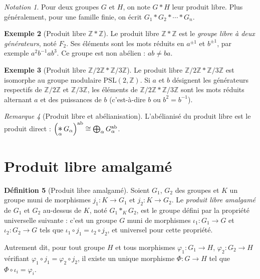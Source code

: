 \documentclass[12pt,a4paper,openany]{book}
\theoremstyle{definition}
\newtheorem{definition}{Définition}[chapter]
\newtheorem{exemple}[definition]{Exemple}
\theoremstyle{plain}
\theoremstyle{remark}
\newtheorem{remarque}[definition]{Remarque}
\newtheorem{notation}[definition]{Notation}
\newcommand{\Z}{\mathbb{Z}}
\begin{document}
\begin{notation}
Pour deux groupes $G$ et $H$, on note $G * H$ leur produit libre.
Plus généralement, pour une famille finie, on écrit $G_1 * G_2 * \cdots * G_n$.
\end{notation}

\begin{exemple}[Produit libre $\Z * \Z$]\label{ex:Z-star-Z}
Le produit libre $\Z * \Z$ est le \emph{groupe libre à deux générateurs},
noté $F_2$. Ses éléments sont les mots réduits en $a^{\pm 1}$ et $b^{\pm 1}$, par exemple
$a^2 b^{-1} a b^3$. Ce groupe est non abélien : $ab \neq ba$.
\end{exemple}

\begin{exemple}[Produit libre $\Z/2\Z * \Z/3\Z$]\label{ex:Z2-star-Z3}
Le produit libre $\Z/2\Z * \Z/3\Z$ est isomorphe au groupe modulaire
$\mathrm{PSL}(2, \Z)$. Si $a$ et $b$ désignent les générateurs
respectifs de $\Z/2\Z$ et $\Z/3\Z$, les éléments de $\Z/2\Z * \Z/3\Z$ sont les
mots réduits alternant $a$ et des puissances de $b$ (c'est-à-dire $b$ ou $b^2 = b^{-1}$).
\end{exemple}

\begin{remarque}[Produit libre et abélianisation]\label{rem:abelianise-produit-libre}
L'abélianisé du produit libre est le produit direct :
$\left(\displaystyle\mathop{\scalebox{1.3}{$\ast$}}_\alpha G_\alpha\right)^{\mathrm{ab}}
\cong \bigoplus_\alpha G_\alpha^{\mathrm{ab}}$.
\end{remarque}

\section{Produit libre amalgamé}\label{sec:produit-amalgame}

\begin{definition}[Produit libre amalgamé]\label{def:produit-amalgame}
Soient $G_1$, $G_2$ des groupes et $K$ un groupe muni de morphismes
$j_1 \colon K \to G_1$ et $j_2 \colon K \to G_2$. Le \emph{produit libre amalgamé}
de $G_1$ et $G_2$ au-dessus de $K$, noté $G_1 *_K G_2$, est le groupe défini par
la propriété universelle suivante : c'est un groupe $G$ muni de morphismes
$\iota_1 \colon G_1 \to G$ et $\iota_2 \colon G_2 \to G$ tels que
$\iota_1 \circ j_1 = \iota_2 \circ j_2$, et universel pour cette propriété.

Autrement dit, pour tout groupe $H$ et tous morphismes $\varphi_1 \colon G_1 \to H$,
$\varphi_2 \colon G_2 \to H$ vérifiant $\varphi_1 \circ j_1 = \varphi_2 \circ j_2$,
il existe un unique morphisme $\Phi \colon G \to H$ tel que $\Phi \circ \iota_i = \varphi_i$.
\end{definition}
\end{document}
